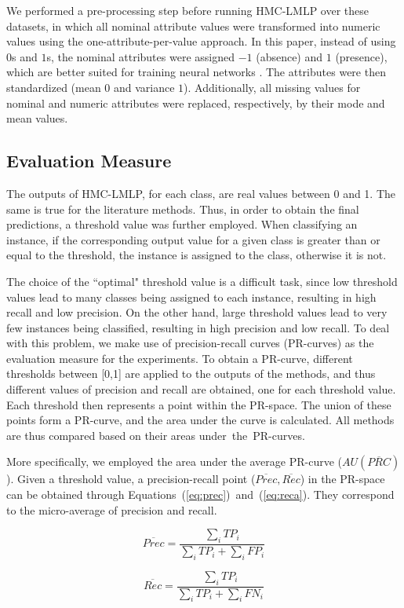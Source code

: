 We performed a pre-processing step before running HMC-LMLP over these datasets, in which all nominal attribute values were transformed into numeric values using the one-attribute-per-value approach. In this paper, instead of using $0$s and $1$s, the nominal attributes were assigned $-1$ (absence) and $1$ (presence), which are better suited for training neural networks \cite{Haykin1999}. The attributes were then standardized (mean $0$ and variance $1$). Additionally, all missing values for nominal and numeric attributes were replaced, respectively, by their mode and mean values.

\subsection{Evaluation Measure}

The outputs of HMC-LMLP, for each class, are real values between 0 and 1. The same is true for the literature methods. Thus, in order to obtain the final predictions, a threshold value was further employed. When classifying an instance, if the corresponding output value for a given class is greater than or equal to the threshold, the instance is assigned to the class, otherwise it is not.

The choice of the ``optimal" threshold value is a difficult task, since low threshold values lead to many classes being assigned to each instance, resulting in high recall and low precision. On the other hand, large threshold values lead to very few instances being classified, resulting in high precision and low recall. To deal with this problem, we make use of precision-recall curves (PR-curves) as the evaluation measure for the experiments. To obtain a PR-curve, different thresholds between [0,1] are applied to the outputs of the methods, and thus different values of precision and recall are obtained, one for each threshold value. Each threshold then represents a point within the PR-space. The union of these points form a PR-curve, and the area under the curve is calculated. All methods are thus compared based on their areas under~the~PR-curves.

More specifically, we employed the area under the average PR-curve ($AU(\overline{PRC})$). Given a threshold value, a precision-recall point ($\overline{Prec},\overline{Rec}$) in the PR-space can be obtained through Equations~(\ref{eq:prec})~and~(\ref{eq:reca}). They correspond to the micro-average of precision and recall.

\begin{multicols}{2}
	\begin{equation}
		\overline{Prec} = \frac{\sum_i TP_i}{\sum_i TP_i + \sum_i FP_i}
		\label{eq:prec}
	\end{equation}

	\begin{equation}
		\overline{Rec} = \frac{\sum_i TP_i}{\sum_i TP_i + \sum_i FN_i}
		\label{eq:reca}
	\end{equation}
\end{multicols}

